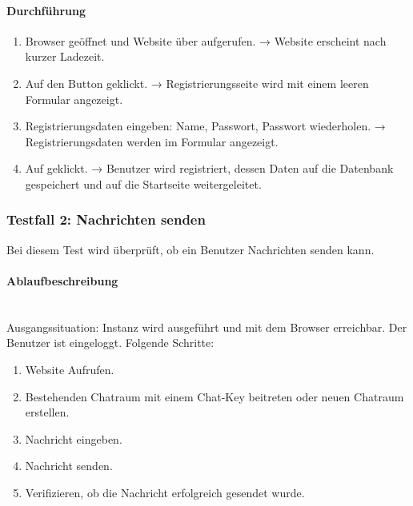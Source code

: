 \paragraph{Durchführung}
\begin{enumerate}
  \item Browser geöffnet und Website über  aufgerufen. \newline
  → Website erscheint nach kurzer Ladezeit.
  \item Auf den Button  geklickt. \newline
  → Registrierungsseite wird mit einem leeren Formular angezeigt.
  \item Registrierungsdaten eingeben: Name, Passwort, Passwort wiederholen. \newline
  → Registrierungsdaten werden im Formular angezeigt.
  \item Auf  geklickt. \newline
  → Benutzer wird registriert, dessen Daten auf die Datenbank gespeichert und auf die Startseite weitergeleitet.
\end{enumerate}

\subsubsection{Testfall 2: Nachrichten senden}
Bei diesem Test wird überprüft, ob ein Benutzer Nachrichten senden kann.
\paragraph{Ablaufbeschreibung} \mbox{}\\
Ausgangssituation: Instanz wird ausgeführt und mit dem Browser erreichbar. Der Benutzer ist eingeloggt. Folgende Schritte: 

\begin{enumerate}
  \item Website Aufrufen.
  \item Bestehenden Chatraum mit einem Chat-Key beitreten oder neuen Chatraum erstellen.
  \item Nachricht eingeben.
  \item Nachricht senden.
  \item Verifizieren, ob die Nachricht erfolgreich gesendet wurde.
\end{enumerate}


